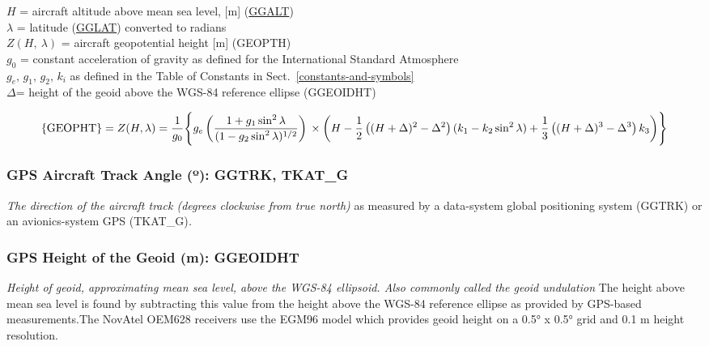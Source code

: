 \documentclass[
]{book}
\begin{document}
\(H\) = aircraft altitude above mean sea level, {[}m{]} (\protect\hyperlink{ggalt}{GGALT})\\
\(\lambda\) = latitude (\protect\hyperlink{gglat}{GGLAT}) converted to radians\\
\(Z(H,\ \lambda)\) = aircraft geopotential height {[}m{]} (GEOPTH)\\
\(g_{0}\) = constant acceleration of gravity as defined for the International
Standard Atmosphere\\
\(g_{e},\,g_{1},\,g_{2},\,k_{i}\) as defined in the Table of Constants
in Sect.~\ref{constants-and-symbols}\\
\(\Delta\)= height of the geoid above the WGS-84 reference ellipse
(GGEOIDHT)

\begin{equation}
\mathrm{\{GEOPHT\}}=Z(H,\lambda)=\frac{1}{g_{0}}\Biggl\{ g_{e}\left(\frac{1+g_{1}\sin^{2}\lambda}{(1-g_{2}\sin^{2}\lambda)^{1/2}}\right) \notag \\   
\times \left(H-\frac{1}{2}\left((H+\Delta)^{2}-\Delta^{2}\right)(k_{1}-k_{2}\sin^{2}\lambda)+\frac{1}{3}\left((H+\Delta)^{3}-\Delta^{3}\right)k_{3}\right)\Biggr\}  
\label{eq:GEOPHT}
\end{equation}

\hypertarget{ggtrk}{%
\subsubsection*{\texorpdfstring{GPS Aircraft Track Angle ({º}): GGTRK, TKAT\_G}{GPS Aircraft Track Angle (º): GGTRK, TKAT\_G}}\label{ggtrk}}

\emph{The direction of the aircraft track (degrees clockwise from true north)} as measured by a data-system global positioning system (GGTRK) or an avionics-system GPS (TKAT\_G)\emph{.}

\hypertarget{ggeoidht}{%
\subsubsection*{GPS Height of the Geoid (m): GGEOIDHT}\label{ggeoidht}}

\emph{Height of geoid, approximating mean sea level, above the WGS-84 ellipsoid. Also commonly called the geoid undulation} The height above mean sea level is found by subtracting this value from the height above the WGS-84 reference ellipse as provided by GPS-based measurements.The NovAtel OEM628 receivers use the EGM96 model which provides geoid height on a 0.5° x 0.5° grid and 0.1 m height resolution.
\end{document}
